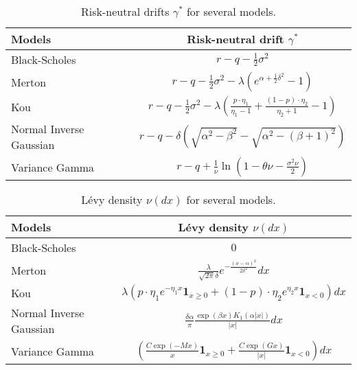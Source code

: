 \begin{table}[!ht]
\centering
  \begin{tabular}{l|c}
    \toprule
    Models & Risk-neutral drift $\gamma^\ast$ \\
    \toprule
   Black-Scholes & $r-q-\frac{1}{2}\sigma^2$ \\
   \midrule
   Merton & $r-q -\frac{1}{2}\sigma^2 - \lambda\left(e^{\alpha+\frac{1}{2}\delta^2}-1\right)$\\
   Kou & $r-q- \frac{1}{2}\sigma^2 -\lambda \left(\frac{p\cdot\eta_1}{\eta_1-1}+\frac{(1-p)\cdot\eta_2}{\eta_2+1}-1\right)$\\
   \midrule
   Normal Inverse Gaussian & $r-q -\delta \left(\sqrt{\alpha^2-\beta^2}-\sqrt{\alpha^2-(\beta+1)^2}\right) $\\
   Variance Gamma &$r-q + \frac{1}{\nu}\ln\left(1-\theta\nu-\frac{\sigma^2\nu}{2}\right)$ \\
    \bottomrule
  \end{tabular}
  \vspace{5pt}
  \caption{\label{tab:rn_drift} Risk-neutral drifts $\gamma^\ast$ for several models.}
\end{table}

\begin{table}[!ht]
\centering
  \begin{tabular}{l|c}
    \toprule
    Models & L\'evy density $\nu(dx)$ \\
    \toprule
   Black-Scholes & $0$ \\
   \midrule
   Merton & $\frac{\lambda}{\sqrt{2\pi}\delta}e^{-\frac{(x-\alpha)^2}{2\delta^2}}dx$\\
   Kou & $\lambda\left(p\cdot\eta_1e^{-\eta_1 x} \mathbf{1}_{x\geq0}+(1-p)\cdot\eta_2e^{\eta_2x}\mathbf{1}_{x<0}\right)dx$\\
   \midrule
   Normal Inverse Gaussian & $\frac{\delta \alpha}{\pi}\frac{\exp(\beta x)K_1(\alpha|x|)}{|x|}dx $\\
   Variance Gamma & $\left(\frac{C\exp(-Mx)}{x}\mathbf{1}_{x\geq0}+\frac{C\exp(Gx)}{|x|}\mathbf{1}_{x<0}\right)dx $ \\
    \bottomrule
  \end{tabular}
  \vspace{5pt}
  \caption{\label{tab:density} L\'evy density $\nu(dx)$ for several models.}
\end{table}

